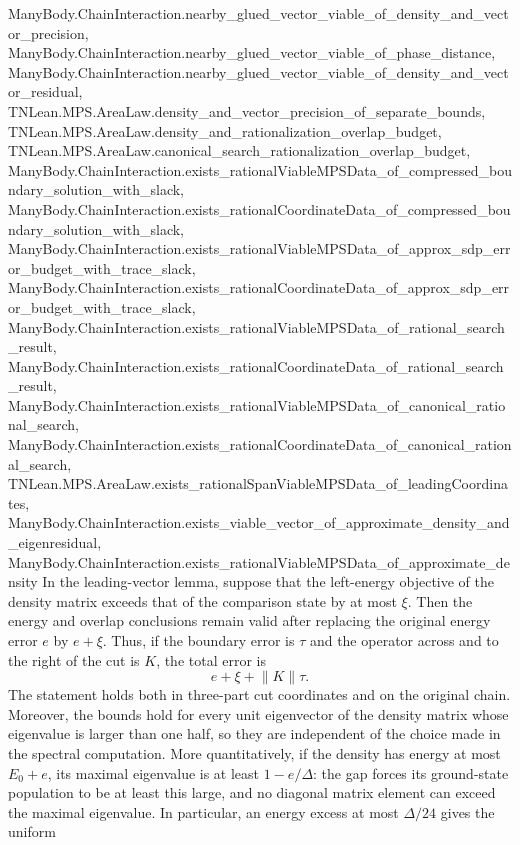 \begin{lemma}
{        ManyBody.ChainInteraction.nearby_glued_vector_viable_of_density_and_vector_precision,
        ManyBody.ChainInteraction.nearby_glued_vector_viable_of_phase_distance,
        ManyBody.ChainInteraction.nearby_glued_vector_viable_of_density_and_vector_residual,
        TNLean.MPS.AreaLaw.density_and_vector_precision_of_separate_bounds,
        TNLean.MPS.AreaLaw.density_and_rationalization_overlap_budget,
        TNLean.MPS.AreaLaw.canonical_search_rationalization_overlap_budget,
        ManyBody.ChainInteraction.exists_rationalViableMPSData_of_compressed_boundary_solution_with_slack,
        ManyBody.ChainInteraction.exists_rationalCoordinateData_of_compressed_boundary_solution_with_slack,
        ManyBody.ChainInteraction.exists_rationalViableMPSData_of_approx_sdp_error_budget_with_trace_slack,
        ManyBody.ChainInteraction.exists_rationalCoordinateData_of_approx_sdp_error_budget_with_trace_slack,
        ManyBody.ChainInteraction.exists_rationalViableMPSData_of_rational_search_result,
        ManyBody.ChainInteraction.exists_rationalCoordinateData_of_rational_search_result,
        ManyBody.ChainInteraction.exists_rationalViableMPSData_of_canonical_rational_search,
        ManyBody.ChainInteraction.exists_rationalCoordinateData_of_canonical_rational_search,
        TNLean.MPS.AreaLaw.exists_rationalSpanViableMPSData_of_leadingCoordinates,
        ManyBody.ChainInteraction.exists_viable_vector_of_approximate_density_and_eigenresidual,
        ManyBody.ChainInteraction.exists_rationalViableMPSData_of_approximate_density}
    \leanok
    In the leading-vector lemma, suppose that the left-energy objective of
    the density matrix exceeds that of the comparison state by at most
    $\xi$.  Then the energy and overlap conclusions remain valid after
    replacing the original energy error $e$ by $e+\xi$.  Thus, if the
    boundary error is $\tau$ and the operator across and to the right of the
    cut is $K$, the total error is
    \[
        e+\xi+\lVert K\rVert\tau.
    \]
    The statement holds both in three-part cut coordinates and on the
    original chain.  Moreover, the bounds hold for every unit eigenvector
    of the density matrix whose eigenvalue is larger than one half, so they
    are independent of the choice made in the spectral computation.
    More quantitatively, if the density has energy at most $E_0+e$, its
    maximal eigenvalue is at least $1-e/\Delta$: the gap forces its
    ground-state population to be at least this large, and no diagonal
    matrix element can exceed the maximal eigenvalue.
    In particular, an energy excess at most $\Delta/24$ gives the uniform

\end{lemma}
